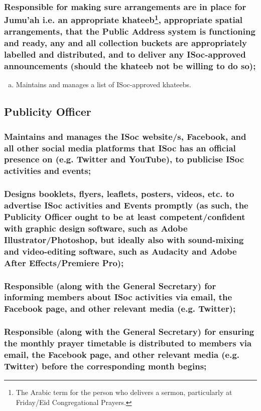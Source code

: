 \documentclass[12pt]{article}
\begin{document}
\subsubsection{Responsible for making sure arrangements are in place for Jumu'ah i.e. an appropriate khateeb\protect\footnote{The Arabic term for the person who delivers a sermon, particularly at Friday/Eid Congregational Prayers.}, appropriate spatial arrangements, that the Public Address system is functioning and ready, any and all collection buckets are appropriately labelled and distributed, and to deliver any ISoc-approved announcements (should the khateeb not be willing to do so);}
\begin{displayquote}
\begin{enumerate}[a.]
\item Maintains and manages a list of ISoc-approved khateebs.
\end{enumerate}
\end{displayquote}
\hspace{1pt}

\subsection{Publicity Officer}
\subsubsection{Maintains and manages the ISoc website/s, Facebook, and all other social media platforms that ISoc has an official presence on (e.g. Twitter and YouTube), to publicise ISoc activities and events;}
\subsubsection{Designs booklets, flyers, leaflets, posters, videos, etc. to advertise ISoc activities and Events promptly (as such, the Publicity Officer ought to be at least competent/confident with graphic design software, such as Adobe Illustrator/Photoshop, but ideally also with sound-mixing and video-editing software, such as Audacity and Adobe After Effects/Premiere Pro);}
\subsubsection{Responsible (along with the General Secretary) for informing members about ISoc activities via email, the Facebook page, and other relevant media (e.g. Twitter);}
\subsubsection{Responsible (along with the General Secretary) for ensuring the monthly prayer timetable is distributed to members via email, the Facebook page, and other relevant media (e.g. Twitter) before the corresponding month begins;}
\end{document}
